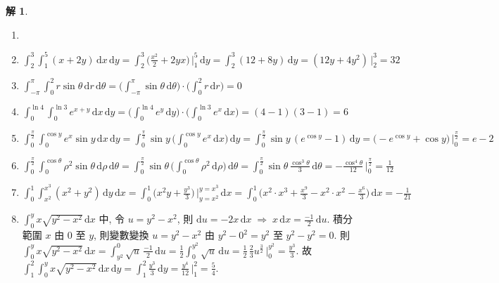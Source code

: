 \documentclass[12pt]{extarticle}
\newcommand{\ds}{\displaystyle}
\newcommand{\ie}{\;\Longrightarrow\;}
\theoremstyle{definition}
\newtheorem*{sol}{解}
\begin{document}
\begin{sol}
  \begin{enumerate}\setlength{\itemsep}{0pt}
    \item[]
    \item $\ds\int_2^3\!\int_1^5\!(x + 2y)\,\text{d}x\,\text{d}y = \int_2^3\!\Big(\frac{x^2}{2} + 2yx\Big)\,\Big|_1^5\,\text{d}y = \int_2^3\!(12 + 8y)\,\text{d}y = (12y + 4y^2)\,\Big|_2^3 = 32$
    \item $\ds\int_{-\pi}^{\pi}\!\int_0^2 r\sin\theta\,\text{d}r\,\text{d}\theta = \bigg(\int_{-\pi}^{\pi}\!\sin\theta\,\text{d}\theta\bigg)\cdot\bigg(\int_0^2 r\,\text{d}r\bigg) = 0$
    \item $\ds\int_0^{\ln 4}\!\!\int_0^{\ln 3}\!\!e^{x + y}\,\text{d}x\,\text{d}y = \bigg(\int_0^{\ln 4}\!\!e^{y}\,\text{d}y\bigg)\cdot\bigg(\int_0^{\ln 3}\!\!e^x\,\text{d}x\bigg) = (4 - 1)(3 - 1) = 6$
    \item $\ds\int_0^{\frac{\pi}{2}}\!\int_0^{\cos y}\!e^x\sin y\,\text{d}x\,\text{d}y = \int_0^{\frac{\pi}{2}}\!\sin y\,\bigg(\int_0^{\cos y}\!e^x\,\text{d}x\bigg)\,\text{d}y = \int_0^{\frac{\pi}{2}}\!\sin y\,(e^{\cos y} - 1)\,\text{d}y = \big(-e^{\cos y} + \cos y\big)\,\Big|_0^{\frac{\pi}{2}} = e - 2$
    \item $\ds\int_0^{\frac{\pi}{2}}\!\int_0^{\cos\theta}\!\!\rho^2\sin\theta\,\text{d}\rho\,\text{d}\theta = \int_0^{\frac{\pi}{2}}\!\sin\theta\,\bigg(\int_0^{\cos\theta}\!\!\rho^2\,\text{d}\rho\bigg)\,\text{d}\theta = \int_0^{\frac{\pi}{2}}\!\sin\theta\,\frac{\cos^3\theta}{3}\,\text{d}\theta = -\frac{\cos^4\theta}{12}\,\bigg|_0^{\frac{\pi}{2}} = \frac{1}{12}$
    \item $\ds\int_0^1\!\int_{x^2}^{x^3}\!(x^2 + y^2)\,\text{d}y\,\text{d}x = \int_0^1\!\bigg(x^2y + \frac{y^3}{3}\bigg)\,\bigg|_{y = x^2}^{y = x^3}\,\text{d}x = \int_0^1\!\bigg(x^2\cdot x^3 + \frac{x^9}{3} - x^2\cdot x^2 - \frac{x^6}{3}\bigg)\,\text{d}x = -\frac{1}{21}$ %
    \item $\ds\int_0^y\!x\sqrt{y^2 - x^2}\,\text{d}x$ 中, 令 $\ds u = y^2 - x^2$, 則 $\ds\text{d}u = -2x\,\text{d}x\ie x\,\text{d}x = \frac{-1}{2}\,\text{d}u$. 積分範圍 $x$ 由 $0$ 至 $y$, 則變數變換 $u = y^2 - x^2$ 由 $y^2 - 0^2 = y^2$ 至 $y^2 - y^2 = 0$. 則 $\ds\int_0^y\!x\sqrt{y^2 - x^2}\,\text{d}x = \int_{y^2}^0\!\!\sqrt{u}\,\frac{-1}{2}\,\text{d}u = \frac{1}{2}\int_0^{y^2}\!\!\!\sqrt{u}\,\text{d}u = \frac{1}{2}\,\frac{2}{3}u^{\frac{3}{2}}\,\Big|_0^{y^2} = \frac{y^3}{3}$. 故 $\ds\int_1^2\!\!\int_0^y\!x\sqrt{y^2 - x^2}\,\text{d}x\,\text{d}y = \int_1^2\!\frac{y^3}{3}\,\text{d}y = \frac{y^4}{12}\,\Big|_1^2 = \frac{5}{4}$.

\end{enumerate}
\end{sol}
\end{document}
